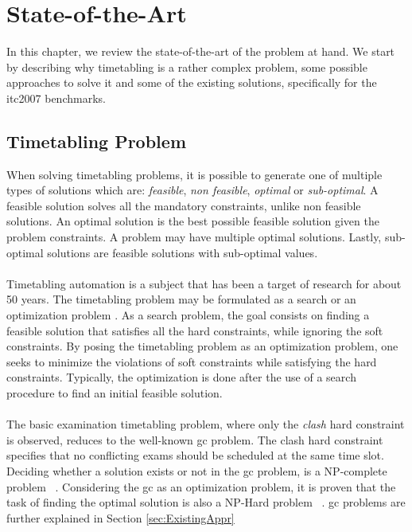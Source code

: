\chapter{State-of-the-Art}
\label{chap:stateofart}
\thispagestyle{plain}

In this chapter, we review the state-of-the-art of the problem at hand. We start by describing why timetabling is a rather complex problem, some possible approaches to solve it and some of the existing solutions, specifically for the \gls{itc2007} benchmarks.\\

\section{Timetabling Problem}

When solving timetabling problems, it is possible to generate one of multiple types of solutions which are: \textit{feasible}, \textit{non feasible}, \textit{optimal} or \textit{sub-optimal}. A feasible solution solves all the mandatory constraints, unlike non feasible solutions. An optimal solution is the best possible feasible solution given the problem constraints. A problem may have multiple optimal solutions. Lastly, sub-optimal solutions are feasible solutions with sub-optimal values.\\
\\
Timetabling automation is a subject that has been a target of research for about 50 years. The timetabling problem may be formulated as a search or an optimization problem \cite{Schaerf1999}. As a search problem, the goal consists on finding a feasible solution that satisfies all the hard constraints, while ignoring the soft constraints. By posing the timetabling problem as an optimization problem, one seeks to minimize the violations of soft constraints while satisfying the hard constraints. Typically, the optimization is done after the use of a search procedure to find an initial feasible solution.\\
\\
The basic examination timetabling problem, where only the \textit{clash} hard constraint is observed, reduces to the well-known \gls{gc} \cite{Jensen2001} problem. The clash hard constraint specifies that no conflicting exams should be scheduled at the same time slot. Deciding whether a solution exists or not in the \gls{gc} problem, is a NP-complete  problem \cite{Arora2009}~\cite{Qu2009}. Considering the \gls{gc} as an optimization problem, it is proven that the task of finding the optimal solution is also a NP-Hard  problem \cite{Arora2009}~\cite{Qu2009}. \gls{gc} problems are further explained in Section \ref{sec:ExistingAppr}
\\
